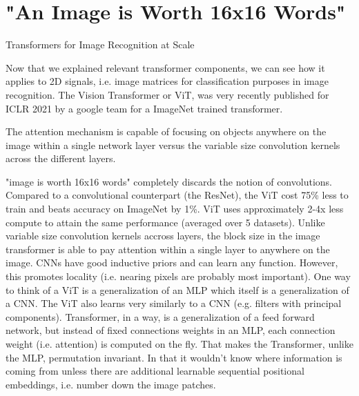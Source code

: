 \section{"An Image is Worth 16x16 Words"}

\large{Transformers for Image Recognition at Scale}

Now that we explained relevant transformer components, we can see how it applies 
to 2D signals, i.e. image matrices for classification purposes in image recognition.
The Vision Transformer or ViT, was very recently published for ICLR 2021 by a 
google team for a ImageNet trained transformer.

The attention mechanism is capable of focusing on objects anywhere on the image 
within a single network layer versus the variable size convolution kernels 
across the different layers.

"image is worth 16x16 words" completely discards the notion of convolutions. 
Compared to a convolutional counterpart (the ResNet), the ViT cost 75\% 
less to train and beats accuracy on ImageNet by 1\%. 
ViT uses approximately 2-4x less compute to attain the same performance 
(averaged over 5 datasets). Unlike variable size convolution kernels accross 
layers, the block size in the image transformer is able to pay attention within 
a single layer to anywhere on the image. 
CNNs have good inductive priors and can learn any function. 
However, this promotes locality (i.e. nearing pixels are probably most important).
One way to think of a ViT is a generalization of an MLP which itself is a 
generalization of a CNN. The ViT also learns very similarly to a CNN 
(e.g. filters with principal components).
Transformer, in a way, is a generalization of a feed forward network, but 
instead of fixed connections weights in an MLP, each connection weight (i.e. attention) 
is computed on the fly. That makes the Transformer, unlike the MLP, permutation invariant. 
In that it wouldn't know where information is coming from unless there are additional 
learnable sequential positional embeddings, i.e. number down the image patches.






